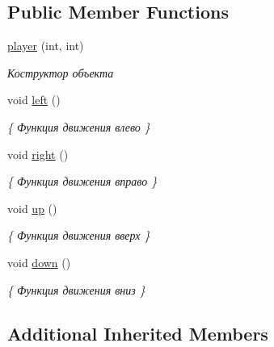 \subsection*{Public Member Functions}
\begin{DoxyCompactItemize}
\item 
\mbox{\hyperlink{classplayer_ab1d9c2ebef05e45ed3c25561d8704111}{player}} (int, int)
\begin{DoxyCompactList}\small\item\em Коструктор объекта \end{DoxyCompactList}\item 
\mbox{\label{classplayer_a92daafe8555040c730695f1d3e768117}} 
void \mbox{\hyperlink{classplayer_a92daafe8555040c730695f1d3e768117}{left}} ()
\begin{DoxyCompactList}\small\item\em \{ Функция движения влево \} \end{DoxyCompactList}\item 
\mbox{\label{classplayer_ae2b3482d0e525c9f58caa01431836f7e}} 
void \mbox{\hyperlink{classplayer_ae2b3482d0e525c9f58caa01431836f7e}{right}} ()
\begin{DoxyCompactList}\small\item\em \{ Функция движения вправо \} \end{DoxyCompactList}\item 
\mbox{\label{classplayer_a3b29bfd1cef8c8934fa0c5ffc93fd539}} 
void \mbox{\hyperlink{classplayer_a3b29bfd1cef8c8934fa0c5ffc93fd539}{up}} ()
\begin{DoxyCompactList}\small\item\em \{ Функция движения вверх \} \end{DoxyCompactList}\item 
\mbox{\label{classplayer_a7bc7d32663c11671b181a120844e0efc}} 
void \mbox{\hyperlink{classplayer_a7bc7d32663c11671b181a120844e0efc}{down}} ()
\begin{DoxyCompactList}\small\item\em \{ Функция движения вниз \} \end{DoxyCompactList}\end{DoxyCompactItemize}
\subsection*{Additional Inherited Members}


